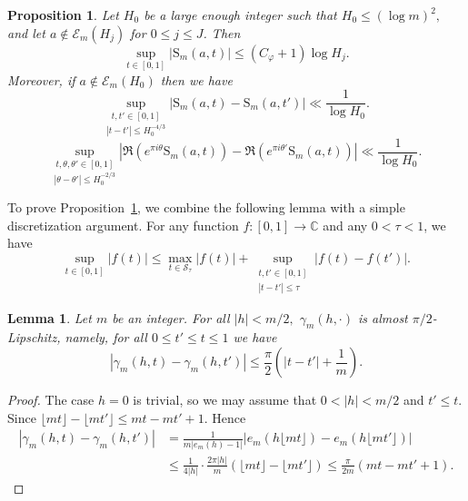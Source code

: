 \documentclass[12pt]{amsart}
\newtheorem{lem}[thm]{Lemma}
\newtheorem{pro}[thm]{Proposition}
\theoremstyle{definition}
\numberwithin{equation}{section}
\numberwithin{equation}{section}
\def\Ecal{\mathcal{E}}
\def\Scal{\mathcal{S}}
\def\B{\mathrm{S}}
\def\Mp{C_\varphi}
\begin{document}
\begin{pro}\label{Pro a not in Ep}
Let $H_0$ be a large enough integer such that $ H_0 \leq (\log m)^2, $ and let $a\not\in \Ecal_m(H_j)$ for $0\leq  j \leq J$. Then
\begin{equation} \label{1*}
    \sup_{t\in [0,1]} \left|\B_m(a,t)\right|\leq (\Mp+1)\log H_j .
\end{equation}
Moreover, if $a\not\in \Ecal_m(H_0)$ then we have
\begin{equation} \label{2*}
\underset{|t-t'|\leq H_0^{-4/3}}{\sup_{t,t'\in [0,1]}} \left|\B_m(a,t)-\B_m(a,t')\right|
\ll \frac{1}{\log H_0}.
\end{equation}
\begin{equation} \label{3*}
\underset{|\theta-\theta'|\leq H_0^{-2/3}}{\sup_{t,\theta,\theta'\in [0,1]}} \left|\Re\left(e^{\pi i\theta}\B_m(a,t)\right)-\Re\left(e^{\pi i\theta'}\B_m(a,t)\right)\right|
\ll \frac{1}{\log H_0}.
\end{equation}
\end{pro}

To prove Proposition~\ref{Pro a not in Ep}, we combine the following lemma with a simple discretization argument. For any function \(f:[0,1]\to\mathbb{C}\) and any \(0<\tau<1\), we have
\begin{equation}\label{propri S_rho}
\sup_{t\in[0,1]} |f(t)|
\leq 
\max_{t\in \Scal_{\tau}} |f(t)|
+ \sup_{\substack{t,t'\in [0,1]\\ |t-t'|\leq \tau}} |f(t)-f(t')|.
\end{equation}

\begin{lem}\label{lem gam lip and sum H<h<2H} Let $m$ be an integer. For all $|h|<m/2,$ $\gamma_m(h,\cdot)$ is almost $\pi/2$-Lipschitz, namely, for all $ 0\leq  t' \leq t \leq 1$ we have
\begin{equation}\label{eq almost lipchitz 1}
|\gamma_m(h,t)-\gamma_m(h,t')|
\leq \frac{\pi}{2}\left(|t-t'| +\frac{1}{m} \right).
\end{equation}

\end{lem}

\begin{proof} The case \(h=0\) is trivial, so we may assume that $0<|h|<m/2$ and  $t'\leq t$. Since
$\lfloor mt\rfloor-\lfloor mt'\rfloor\leq
mt-mt'+1.$ Hence
\begin{align*}
|\gamma_m(h,t)-\gamma_m(h,t')|
&=
\frac{1}{m|e_m(h)-1|}\left|
e_m(h\lfloor mt\rfloor)-e_m(h\lfloor mt'\rfloor)
\right|\\
&\leq 
\frac{1}{4|h|}\cdot \frac{2\pi
\left| h\right| }{m}\left(\lfloor mt\rfloor-\lfloor mt'\rfloor\right)
\leq 
\frac{\pi }{2m}\left(mt-mt'+1\right).
\end{align*}
\end{proof}
\end{document}
